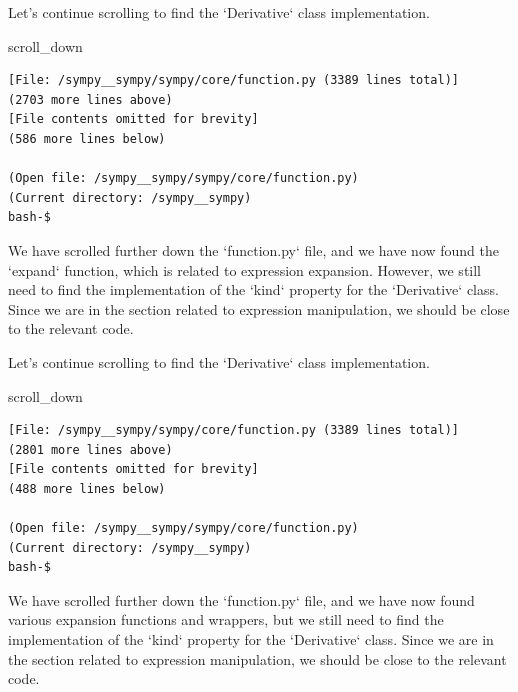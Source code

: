 {\begin{agentbox}
Let's continue scrolling to find the `Derivative` class implementation.



\hrulefill
\begin{CodeVerbatim}[breaklines=true, breakanywhere=true]
scroll_down
\end{CodeVerbatim}
\end{agentbox}
\begin{observationbox}\begin{Verbatim}[breaklines=true, breakanywhere=true]
[File: /sympy__sympy/sympy/core/function.py (3389 lines total)]
(2703 more lines above)
[File contents omitted for brevity]
(586 more lines below)

(Open file: /sympy__sympy/sympy/core/function.py)
(Current directory: /sympy__sympy)
bash-$
\end{Verbatim}
\end{observationbox}
\begin{agentbox}
We have scrolled further down the `function.py` file, and we have now found the `expand` function, which is related to expression expansion. However, we still need to find the implementation of the `kind` property for the `Derivative` class. Since we are in the section related to expression manipulation, we should be close to the relevant code.



Let's continue scrolling to find the `Derivative` class implementation.



\hrulefill
\begin{CodeVerbatim}[breaklines=true, breakanywhere=true]
scroll_down
\end{CodeVerbatim}
\end{agentbox}
\begin{observationbox}\begin{Verbatim}[breaklines=true, breakanywhere=true]
[File: /sympy__sympy/sympy/core/function.py (3389 lines total)]
(2801 more lines above)
[File contents omitted for brevity]
(488 more lines below)

(Open file: /sympy__sympy/sympy/core/function.py)
(Current directory: /sympy__sympy)
bash-$
\end{Verbatim}
\end{observationbox}
\begin{agentbox}
We have scrolled further down the `function.py` file, and we have now found various expansion functions and wrappers, but we still need to find the implementation of the `kind` property for the `Derivative` class. Since we are in the section related to expression manipulation, we should be close to the relevant code.




\end{agentbox}}
